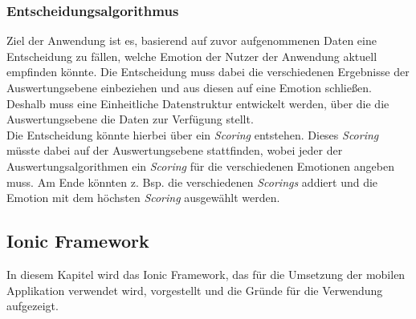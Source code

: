 \subsubsection{Entscheidungsalgorithmus}
Ziel der Anwendung ist es, basierend auf zuvor aufgenommenen Daten eine Entscheidung zu fällen, welche Emotion der Nutzer der 
Anwendung aktuell empfinden könnte. Die Entscheidung muss dabei die verschiedenen Ergebnisse der Auswertungsebene einbeziehen
und aus diesen auf eine Emotion schließen. Deshalb muss eine Einheitliche Datenstruktur entwickelt werden, über die die Auswertungsebene
die Daten zur Verfügung stellt. \\
Die Entscheidung könnte hierbei über ein \textit{Scoring} entstehen. Dieses \textit{Scoring} müsste dabei auf der Auswertungsebene stattfinden, 
wobei jeder der Auswertungsalgorithmen ein \textit{Scoring} für die verschiedenen Emotionen angeben muss. Am Ende könnten z. Bsp. die verschiedenen 
\textit{Scorings} addiert und die Emotion mit dem höchsten \textit{Scoring} ausgewählt werden.
\subsection{Ionic Framework}
In diesem Kapitel wird das Ionic Framework, das für die Umsetzung der mobilen Applikation verwendet wird, vorgestellt und die Gründe für die Verwendung aufgezeigt.
